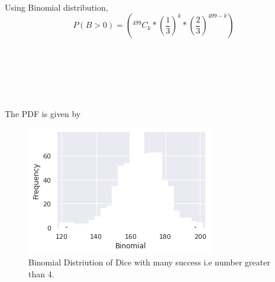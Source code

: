 \documentclass[journal,12pt,twocolumn]{IEEEtran}
\begin{document}
\\Using Binomial distribution,
\begin{equation}
P(B>0)=( { }^{499}C_{k}*(\frac{1}{3})^{k}*(\frac{2}{3})^{499-k})
\end{equation}\\
\\
\\
\\
\\
\\
The PDF is given by
\begin{figure}
	\includegraphics[width=\linewidth]{Numr_4_499_success.png}
  \caption{Binomial Distriution of Dice with many success i.e number greater than 4.}
  \label{fig:Fig3}
\end{figure}
\end{document}
